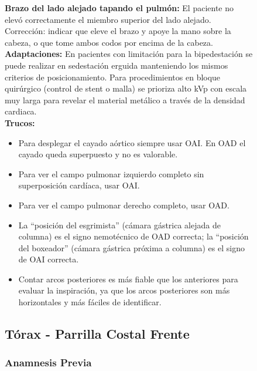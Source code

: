 \begin{figure}
{\textbf{Brazo del lado alejado tapando el pulmón:} El paciente no elevó correctamente el miembro
superior del lado alejado. Corrección: indicar que eleve el brazo y apoye la mano sobre la cabeza,
o que tome ambos codos por encima de la cabeza.\\

\textbf{Adaptaciones:} En pacientes con limitación para la bipedestación se puede realizar
en sedestación erguida manteniendo los mismos criterios de posicionamiento. Para procedimientos
en bloque quirúrgico (control de stent o malla) se prioriza alto kVp con escala muy larga
para revelar el material metálico a través de la densidad cardiaca.\\

\textbf{Trucos:}
\begin{itemize}
  \item Para desplegar el cayado aórtico siempre usar OAI. En OAD el cayado queda superpuesto
        y no es valorable.
  \item Para ver el campo pulmonar izquierdo completo sin superposición cardíaca, usar OAI.
  \item Para ver el campo pulmonar derecho completo, usar OAD.
  \item La ``posición del esgrimista'' (cámara gástrica alejada de columna) es el signo
        nemotécnico de OAD correcta; la ``posición del boxeador'' (cámara gástrica próxima a
        columna) es el signo de OAI correcta.
  \item Contar arcos posteriores es más fiable que los anteriores para evaluar la inspiración,
        ya que los arcos posteriores son más horizontales y más fáciles de identificar.
\end{itemize}

\clearpage


\subsection{Tórax - Parrilla Costal Frente}

\subsubsection*{Anamnesis Previa}

}
\end{figure}
